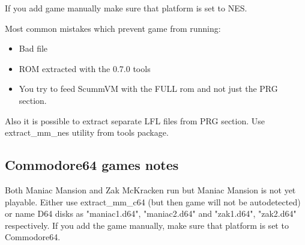 If you add game manually make sure that platform is set to NES.

Most common mistakes which prevent game from running:

\begin{itemize}
  \item Bad file
  \item ROM extracted with the 0.7.0 tools
  \item You try to feed ScummVM with the FULL rom and not just the PRG section.
\end{itemize}

Also it is possible to extract separate LFL files from PRG section. Use
extract\_mm\_nes utility from tools package.


\subsection{Commodore64 games notes}
Both Maniac Mansion and Zak McKracken run but Maniac Mansion is not yet
playable. Either use extract\_mm\_c64 (but then game will not be autodetected)
or name D64 disks as "maniac1.d64", "maniac2.d64" and "zak1.d64", "zak2.d64"
respectively. If you add the game manually, make sure that platform is set to
Commodore64.
